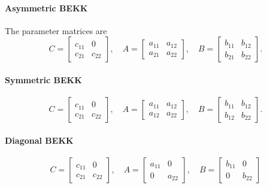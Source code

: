 \documentclass[11pt]{article}
\begin{document}
\paragraph{Asymmetric BEKK}

The parameter matrices are
\begin{equation}
C=\left[\begin{array}{cc}
c_{11} & 0 \\
c_{21} & c_{22}
\end{array}\right], \quad A=\left[\begin{array}{ll}
a_{11} & a_{12} \\
a_{21} & a_{22}
\end{array}\right], \quad B=\left[\begin{array}{ll}
b_{11} & b_{12} \\
b_{21} & b_{22}
\end{array}\right] .
\end{equation}

\paragraph{Symmetric BEKK}
\begin{equation}
C=\left[\begin{array}{cc}
c_{11} & 0 \\
c_{21} & c_{22}
\end{array}\right], \quad A=\left[\begin{array}{ll}
a_{11} & a_{12} \\
a_{12} & a_{22}
\end{array}\right], \quad B=\left[\begin{array}{ll}
b_{11} & b_{12} \\
b_{12} & b_{22}
\end{array}\right] .
\end{equation}

\paragraph{Diagonal BEKK}

\begin{equation}
C=\left[\begin{array}{cc}
c_{11} & 0 \\
c_{21} & c_{22}
\end{array}\right], \quad A=\left[\begin{array}{cc}
a_{11} & 0 \\
0 & a_{22}
\end{array}\right], \quad B=\left[\begin{array}{cc}
b_{11} & 0 \\
0 & b_{22}
\end{array}\right]
\end{equation}
\end{document}
